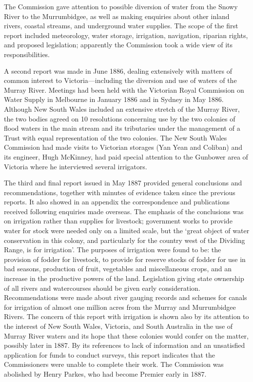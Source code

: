 The Commission gave attention to possible diversion of water from the
Snowy River to the Murrumbidgee, as well as making enquiries about
other inland rivers, coastal streams, and underground water supplies.
The scope of the first report included meteorology, water storage,
irrigation, navigation, riparian rights, and proposed legislation;
apparently the Commission took a wide view of its responsibilities.

A second report was made in June 1886, dealing extensively with
matters of common interest to Victoria---including the diversion and
use of waters of the Murray River.  Meetings had been held with the
Victorian Royal Commission on Water Supply in Melbourne in January
1886 and in Sydney in May 1886.  Although New South Wales included an
extensive stretch of the Murray River, the two bodies agreed on 10
resolutions concerning use by the two colonies of flood waters in the
main stream and its tributaries under the management of a Trust with
equal representation of the two colonies.  The New South Wales
Commission had made visits to Victorian storages (Yan Yean and
Coliban) and its engineer, Hugh McKinney, had paid special attention
to the Gunbower area of Victoria where he interviewed several
irrigators.

The third and final report issued in May 1887 provided general
conclusions and recommendations, together with minutes of evidence
taken since the previous reports.  It also showed in an appendix the
correspondence and publications received following enquiries made
overseas.  The emphasis of the conclusions was on irrigation rather
than supplies for livestock; government works to provide water for
stock were needed only on a limited scale, but the `great object of
water conservation in this colony, and particularly for the country
west of the Dividing Range, is for irrigation'.  The purposes of
irrigation were found to be: the provision of fodder for livestock, to
provide for reserve stocks of fodder for use in bad seasons,
production of fruit, vegetables and miscellaneous crops, and an
increase in the productive powers of the land.  Legislation giving
state ownership of all rivers and watercourses should be given early
consideration.  Recommendations were made about river gauging records
and schemes for canals for irrigation of almost one million acres from
the Murray and Murrumbidgee Rivers.  The concern of this report with
irrigation is shown also by its attention to the interest of New South
Wales, Victoria, and South Australia in the use of Murray River waters
and its hope that these colonies would confer on the matter, possibly
later in 1887.  By its references to lack of information and an
unsatisfied application for funds to conduct surveys, this report
indicates that the Commissioners were unable to complete their
work.  The Commission was abolished by Henry Parkes, who had
become Premier early in 1887.

